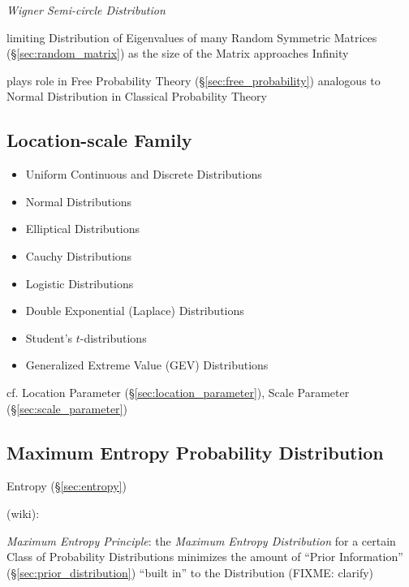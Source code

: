 \emph{Wigner Semi-circle Distribution}

limiting Distribution of Eigenvalues of many Random Symmetric Matrices
(\S\ref{sec:random_matrix}) as the size of the Matrix approaches Infinity

plays role in Free Probability Theory (\S\ref{sec:free_probability}) analogous
to Normal Distribution in Classical Probability Theory



\subsection{Location-scale Family}\label{sec:location_scale}

\begin{itemize}
  \item Uniform Continuous and Discrete Distributions
  \item Normal Distributions
  \item Elliptical Distributions
  \item Cauchy Distributions
  \item Logistic Distributions
  \item Double Exponential (Laplace) Distributions
  \item Student's $t$-distributions
  \item Generalized Extreme Value (GEV) Distributions
\end{itemize}


\fist cf. Location Parameter (\S\ref{sec:location_parameter}), Scale Parameter
(\S\ref{sec:scale_parameter})



\subsection{Maximum Entropy Probability Distribution}\label{sec:maximum_entropy}

Entropy (\S\ref{sec:entropy})

(wiki):

\emph{Maximum Entropy Principle}: the \emph{Maximum Entropy Distribution} for a
certain Class of Probability Distributions minimizes the amount of ``Prior
Information'' (\S\ref{sec:prior_distribution}) ``built in'' to the Distribution
(FIXME: clarify)

